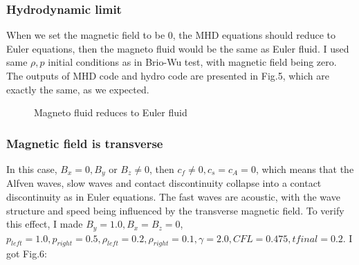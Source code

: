 \documentclass[11pt, oneside]{article}   	%
\begin{document}
\subsubsection{Hydrodynamic limit}
When we set the magnetic field to be 0, the MHD equations should reduce to Euler equations, then the magneto fluid would be the same as Euler fluid. I used same $\rho,p$ initial conditions as in Brio-Wu test, with magnetic field being zero. The outputs of MHD code and hydro code are presented in Fig.5, which are exactly the same, as we expected.

\begin{figure}[H]
\centering
{}
\caption{Magneto fluid reduces to Euler fluid}
\end{figure}

\subsubsection{Magnetic field is transverse}
In this case, $B_x = 0, B_y $ or $ B_z \neq 0$, then $c_f \neq 0, c_s = c_A = 0$, which means that the Alfven waves, slow waves and contact discontinuity collapse into a contact discontinuity as in Euler equations. The fast waves are acoustic, with the wave structure and speed being influenced by the transverse magnetic field. To verify this effect, I made $B_y = 1.0, B_x = B_z = 0$, $p_{left} = 1.0, p_{right} = 0.5, \rho_{left} = 0.2, \rho_{right} = 0.1, \gamma = 2.0, CFL = 0.475, tfinal = 0.2$. I got Fig.6:
\end{document}
